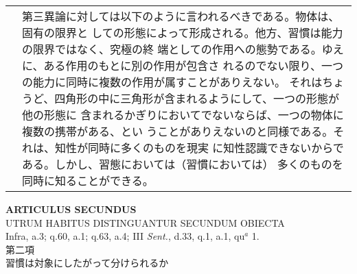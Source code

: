 \documentclass[10pt]{jsarticle}
\begin{document}
\begin{longtable}{p{21em}p{21em}}
&

第三異論に対しては以下のように言われるべきである。物体は、固有の限界と
しての形態によって形成される。他方、習慣は能力の限界ではなく、究極の終
端としての作用への態勢である。ゆえに、ある作用のもとに別の作用が包含さ
れるのでない限り、一つの能力に同時に複数の作用が属すことがありえない。
それはちょうど、四角形の中に三角形が含まれるようにして、一つの形態が他の形態に
含まれるかぎりにおいてでないならば、一つの物体に複数の携帯がある、とい
うことがありえないのと同様である。それは、知性が同時に多くのものを現実
に知性認識できないからである。しかし、習態においては（習慣においては）
多くのものを同時に知ることができる。

\end{longtable}
\newpage

\begin{center}
{\Large {\bf ARTICULUS SECUNDUS}}\\
{\large UTRUM HABITUS DISTINGUANTUR SECUNDUM OBIECTA}\\
{\footnotesize Infra, a.3; q.60, a.1; q.63, a.4; III {\itshape Sent.}, d.33, q.1, a.1, qu$^{a}$ 1.}\\
{\Large 第二項\\習慣は対象にしたがって分けられるか}
\end{center}
\end{document}
